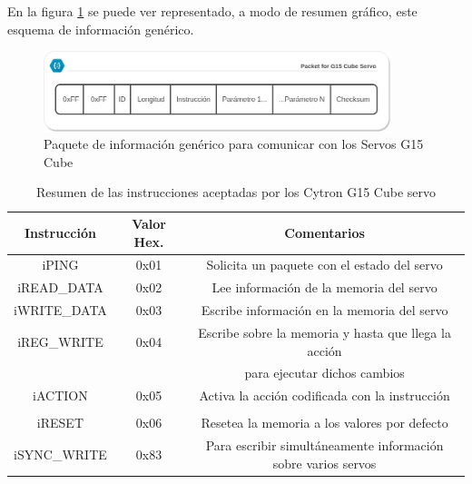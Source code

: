     En la figura \ref{fig:app:registrosg15:comunicacion_mensaje} se puede ver representado, a modo de resumen gráfico, este esquema de información genérico.	
    
    \begin{figure}[H]
    	\centering
    	\includegraphics[width=0.9\textwidth]{figuras/Imagenes_SW/Packet_G15.png}   
    	\caption{Paquete de información genérico para comunicar con los Servos G15 Cube}
    	\label{fig:app:registrosg15:comunicacion_mensaje}
    \end{figure}
	

	\begin{table}[htbp]
		\centering
		\caption{Resumen de las instrucciones aceptadas por los Cytron G15 Cube servo}
		\label{tab:g15_instructions}
		\begin{center}
			\begin{tabular}{|c|c|c|}
			\hline
			\textbf{Instrucción} & \textbf{Valor Hex.} & \textbf{Comentarios} \\
			\hline
			iPING & 0x01 & Solicita un paquete con el estado del servo \\
			\hline
			iREAD\_DATA & 0x02 & Lee información de la memoria del servo \\
			\hline
			iWRITE\_DATA & 0x03 & Escribe información en la memoria del servo \\
			\hline
			iREG\_WRITE & 0x04 & Escribe sobre la memoria y hasta que llega la acción \\ &&  \ingles{ACTION} para ejecutar dichos cambios \\
			\hline
			iACTION & 0x05 & Activa la acción codificada con la instrucción \\ && \ingles{REG\_WRITE} \\
			\hline
			iRESET & 0x06 & Resetea la memoria a los valores por defecto \\
			\hline
			iSYNC\_WRITE & 0x83 & Para escribir simultáneamente información sobre varios servos \\
			\hline
			\end{tabular}
		\end{center}
	\end{table}	
	
